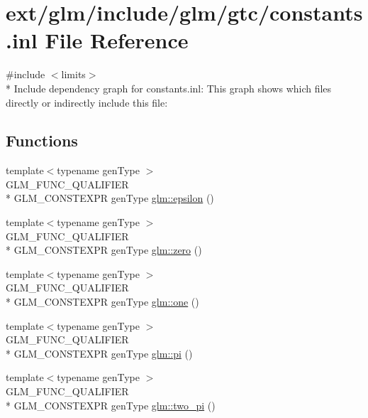 \hypertarget{constants_8inl}{\section{ext/glm/include/glm/gtc/constants.inl File Reference}
\label{constants_8inl}
}
{\ttfamily \#include $<$limits$>$}\\*
Include dependency graph for constants.\-inl\-:
This graph shows which files directly or indirectly include this file\-:
\subsection*{Functions}
\begin{DoxyCompactItemize}
\item 
{\footnotesize template$<$typename gen\-Type $>$ }\\G\-L\-M\-\_\-\-F\-U\-N\-C\-\_\-\-Q\-U\-A\-L\-I\-F\-I\-E\-R \\*
G\-L\-M\-\_\-\-C\-O\-N\-S\-T\-E\-X\-P\-R gen\-Type \hyperlink{group__gtc__constants_ga2a1e57fc5592b69cfae84174cbfc9429}{glm\-::epsilon} ()
\item 
{\footnotesize template$<$typename gen\-Type $>$ }\\G\-L\-M\-\_\-\-F\-U\-N\-C\-\_\-\-Q\-U\-A\-L\-I\-F\-I\-E\-R \\*
G\-L\-M\-\_\-\-C\-O\-N\-S\-T\-E\-X\-P\-R gen\-Type \hyperlink{group__gtc__constants_ga788f5a421fc0f40a1296ebc094cbaa8a}{glm\-::zero} ()
\item 
{\footnotesize template$<$typename gen\-Type $>$ }\\G\-L\-M\-\_\-\-F\-U\-N\-C\-\_\-\-Q\-U\-A\-L\-I\-F\-I\-E\-R \\*
G\-L\-M\-\_\-\-C\-O\-N\-S\-T\-E\-X\-P\-R gen\-Type \hyperlink{group__gtc__constants_ga39c2fb227631ca25894326529bdd1ee5}{glm\-::one} ()
\item 
{\footnotesize template$<$typename gen\-Type $>$ }\\G\-L\-M\-\_\-\-F\-U\-N\-C\-\_\-\-Q\-U\-A\-L\-I\-F\-I\-E\-R \\*
G\-L\-M\-\_\-\-C\-O\-N\-S\-T\-E\-X\-P\-R gen\-Type \hyperlink{group__gtc__constants_ga94bafeb2a0f23ab6450fed1f98ee4e45}{glm\-::pi} ()
\item 
{\footnotesize template$<$typename gen\-Type $>$ }\\G\-L\-M\-\_\-\-F\-U\-N\-C\-\_\-\-Q\-U\-A\-L\-I\-F\-I\-E\-R \\*
G\-L\-M\-\_\-\-C\-O\-N\-S\-T\-E\-X\-P\-R gen\-Type \hyperlink{group__gtc__constants_gaa5276a4617566abcfe49286f40e3a256}{glm\-::two\-\_\-pi} ()

\end{DoxyCompactItemize}

